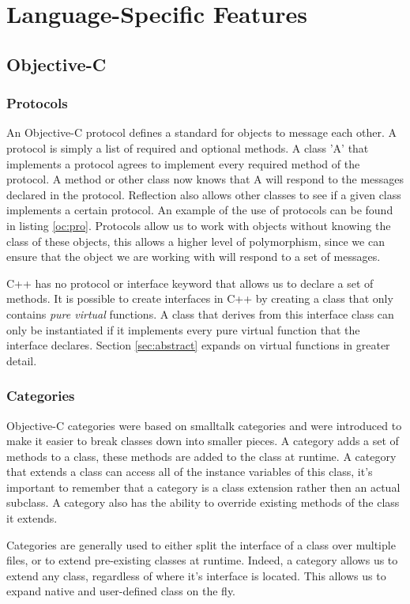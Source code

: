 \documentclass[12pt, a4paper, twocolumn]{article}
\begin{document}
\section{Language-Specific \-Features}
\subsection{Objective-C}
\subsubsection{Protocols}
\label{sec:protocol}
An Objective-C protocol defines a standard for objects to message each other. A protocol is simply a list of required and optional methods. A class 'A' that implements a protocol agrees to implement every required method of the protocol. A method or other class now knows that A will respond to the messages declared in the protocol. Reflection also allows other classes to see if a given class implements a certain protocol. An example of the use of protocols can be found in listing \ref{oc:pro}. Protocols allow us to work with objects without knowing the class of these objects, this allows a higher level of polymorphism, since we can ensure that the object we are working with will respond to a set of messages.

C++ has no protocol or interface keyword that allows us to declare a set of methods. It is possible to create interfaces in C++ by creating a class that only contains \textit{pure virtual} functions. A class that derives from this interface class can only be instantiated if it implements every pure virtual function that the interface declares. Section \ref{sec:abstract} expands on virtual functions in greater detail.

\subsubsection{Categories}
\label{sec:categories}
Objective-C categories were based on smalltalk categories and were introduced to make it easier to break classes down into smaller pieces. A category adds a set of methods to a class, these methods are added to the class at runtime. A category that extends a class can access all of the instance variables of this class, it's important to remember that a category is a class extension rather then an actual subclass. A category also has the ability to override existing methods of the class it extends.

Categories are generally used to either split the interface of a class over multiple files, or to extend pre-existing classes at runtime. Indeed, a category allows us to extend any class, regardless of where it's interface is located. This allows us to expand native and user-defined class on the fly.
\end{document}
